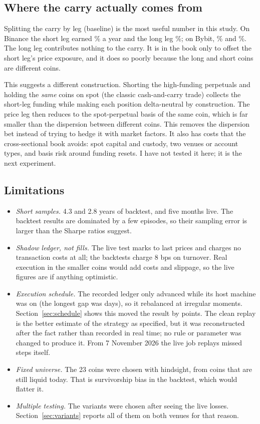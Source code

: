 \documentclass[11pt,a4paper]{article}
\begin{document}
\subsection{Where the carry actually comes from}

Splitting the carry by leg (baseline) is the most useful number in this study. On
Binance the short leg earned \BnCarryShort\% a year and the long leg \BnCarryLong\%; on
Bybit, \ByCarryShort\% and \ByCarryLong\%. The long leg contributes nothing to the carry.
It is in the book only to offset the short leg's price exposure, and it does so poorly
because the long and short coins are different coins.

This suggests a different construction. Shorting the high-funding perpetuals and
holding the \emph{same} coins on spot (the classic cash-and-carry trade) collects the
short-leg funding while making each position delta-neutral by construction. The price
leg then reduces to the spot-perpetual basis of the same coin, which is far smaller
than the dispersion between different coins. This removes the dispersion bet instead
of trying to hedge it with market factors. It also has costs that the cross-sectional
book avoids: spot capital and custody, two venues or account types, and basis risk
around funding resets. I have not tested it here; it is the next experiment.

\subsection{Limitations}

\begin{itemize}
  \item \emph{Short samples.} 4.3 and 2.8 years of backtest, and five months live. The
    backtest results are dominated by a few episodes, so their sampling error is larger
    than the Sharpe ratios suggest.
  \item \emph{Shadow ledger, not fills.} The live test marks to last prices and charges
    no transaction costs at all; the backtests charge 8 bps on turnover. Real execution
    in the smaller coins would add costs and slippage, so the live figures are if
    anything optimistic.
  \item \emph{Execution schedule.} The recorded ledger only advanced while its host
    machine was on (the longest gap was \LiveLongestGap{} days), so it rebalanced at
    irregular moments. Section~\ref{sec:schedule} shows this moved the result by
    \CleanGap{} points. The clean replay is the better estimate of the strategy as
    specified, but it was reconstructed after the fact rather than recorded in real
    time; no rule or parameter was changed to produce it. From 7 November 2026 the live
    job replays missed steps itself.
  \item \emph{Fixed universe.} The 23 coins were chosen with hindsight, from coins that
    are still liquid today. That is survivorship bias in the backtest, which would
    flatter it.
  \item \emph{Multiple testing.} The variants were chosen after seeing the live losses.
    Section~\ref{sec:variants} reports all of them on both venues for that reason.
\end{itemize}
\end{document}
